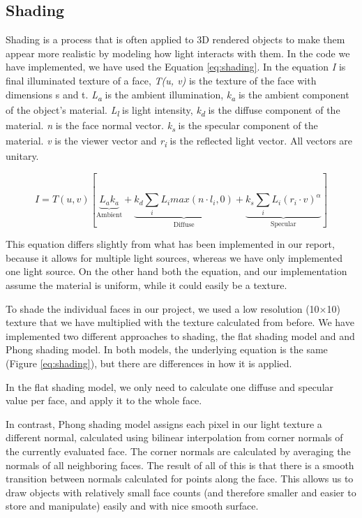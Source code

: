 \subsection{Shading}

Shading is a process that is often applied to 3D rendered objects to make them appear more realistic by modeling  how light interacts with them. In the code we have implemented, we have used the Equation \ref{eq:shading}. In the equation \textit{I} is final illuminated texture of a face, \textit{T(u, v)} is the texture of the face with dimensions s and t. \textit{L\textsubscript{a}} is the ambient illumination, \textit{k\textsubscript{a}} is the ambient component of the object's material. \textit{L\textsubscript{l}} is light intensity, \textit{k\textsubscript{d}} is the diffuse component of the material. \textit{n} is the face normal vector. \textit{k\textsubscript{s}} is the specular component of the material. \textit{v} is the viewer vector and \textit{r\textsubscript{i}} is the reflected light vector. All vectors are unitary.

\begin{equation}
	I=T(u,v)[
	\underbrace{
	L_{a}k_{a}
	}_\text{Ambient}
	+
	\underbrace{
	k_{d}\sum\limits_{i}L_{i}max(n\cdot l_{i},0)
	}_\text{Diffuse}
	+
	\underbrace{
	k_{s}\sum\limits_{i}L_{i}(r_{i}\cdot v)^\alpha
	  }_\text{Specular}
	]
	\label{eq:shading}
\end{equation}

This equation differs slightly from what has been implemented in our report, because it allows for multiple light sources, whereas we have only implemented one light source. On the other hand both the equation, and our implementation assume the material is uniform, while it could easily be a texture.

To shade the individual faces in our project, we used a low resolution (10$\times$10) texture that we have multiplied with the texture calculated from before. We have implemented two different approaches to shading, the flat shading model and and Phong shading model. In both models, the underlying equation is the same (Figure \ref{eq:shading}), but there are differences in how it is applied.

In the flat shading model, we only need to calculate one diffuse and specular value per face, and apply it to the whole face.

In contrast, Phong shading model assigns each pixel in our light texture a different normal, calculated using bilinear interpolation from corner normals of the currently evaluated face. The corner normals are calculated by averaging the normals of all neighboring faces. The result of all of this is that there is a smooth transition between normals calculated for points along the face. This allows us to draw objects with relatively small face counts (and therefore smaller and easier to store and manipulate) easily and with nice smooth surface. 

